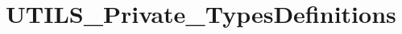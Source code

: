 \hypertarget{group___u_t_i_l_s___private___types_definitions}{}\section{U\+T\+I\+L\+S\+\_\+\+Private\+\_\+\+Types\+Definitions}
\label{group___u_t_i_l_s___private___types_definitions}
